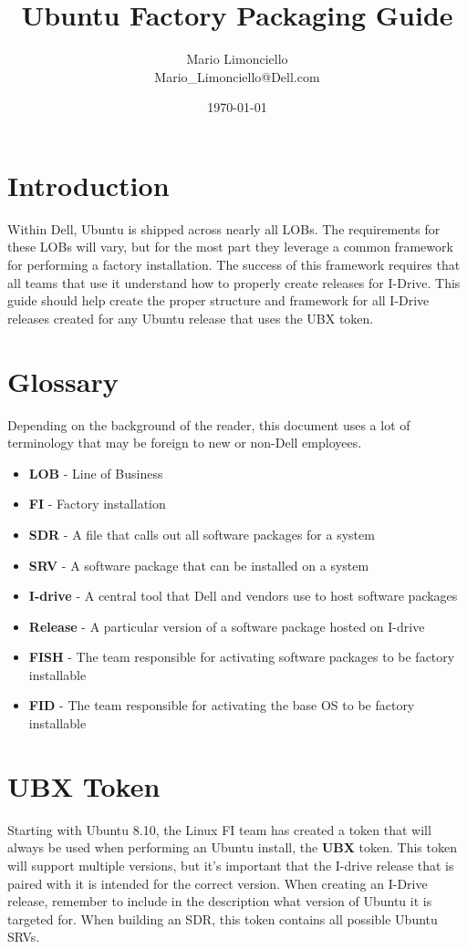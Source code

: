 \documentclass[letterpaper,10pt,titlepage]{article}
\title{\textbf{Ubuntu Factory Packaging Guide}}
\author{Mario Limonciello\\ Mario\_Limonciello@Dell.com}
\date{\today}
\begin{document}
\maketitle

\tableofcontents
\newpage

\section{Introduction}
Within Dell, Ubuntu is shipped across nearly all LOBs.  The requirements for these LOBs will vary, but for the most part they leverage a common framework for performing a factory installation.  The success of this framework requires that all teams that use it understand how to properly create releases for I-Drive.  This guide should help create the proper structure and framework for all I-Drive releases created for any Ubuntu release that uses the UBX token.

\section{Glossary}
Depending on the background of the reader, this document uses a lot of terminology that may be foreign to new or non-Dell employees.
\begin{itemize}
\item \textbf{LOB} - Line of Business
\item \textbf{FI} - Factory installation
\item \textbf{SDR} - A file that calls out all software packages for a system
\item \textbf{SRV} - A software package that can be installed on a system
\item \textbf{I-drive} - A central tool that Dell and vendors use to host software packages
\item \textbf{Release} - A particular version of a software package hosted on I-drive
\item \textbf{FISH} - The team responsible for activating software packages to be factory installable
\item \textbf{FID} - The team responsible for activating the base OS to be factory installable
\end{itemize}

\section{UBX Token}
Starting with Ubuntu 8.10, the Linux FI team has created a token that will always be used when performing an Ubuntu install, the \textbf{UBX} token.  This token will support multiple versions, but it's important that the I-drive release that is paired with it is intended for the correct version.  When creating an I-Drive release, remember to include in the description what version of Ubuntu it is targeted for.  When building an SDR, this token contains all possible Ubuntu SRVs.
\pagebreak 
\end{document}
